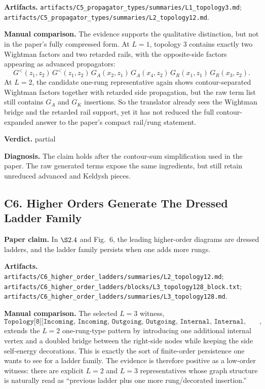 \documentclass[11pt]{article}
\begin{document}
\textbf{Artifacts.} \texttt{artifacts/C5\_propagator\_types/summaries/L1\_topology3.md}; \texttt{artifacts/C5\_propagator\_types/summaries/L2\_topology12.md}.

\textbf{Manual comparison.} The evidence supports the qualitative distinction, but not in the paper's fully compressed form. At $L=1$, topology 3 contains exactly two Wightman factors and two retarded rails, with the opposite-side factors appearing as advanced propagators:
\[
G^<(z_1,z_2)\,G^<(z_1,z_2)\,G_A(x_2,z_1)\,G_A(x_4,z_2)\,G_R(x_1,z_1)\,G_R(x_3,z_2).
\]
At $L=2$, the candidate one-rung representative again shows contour-separated Wightman factors together with retarded side propagation, but the raw term list still contains $G_A$ and $G_K$ insertions. So the translator already sees the Wightman bridge and the retarded rail support, yet it has not reduced the full contour-expanded answer to the paper's compact rail/rung statement.

\textbf{Verdict.} partial

\textbf{Diagnosis.} The claim holds after the contour-sum simplification used in the paper. The raw generated terms expose the same ingredients, but still retain unreduced advanced and Keldysh pieces.

\subsection*{C6. Higher Orders Generate The Dressed Ladder Family}
\textbf{Paper claim.} In $\S 2.4$ and Fig.~6, the leading higher-order diagrams are dressed ladders, and the ladder family persists when one adds more rungs.

\textbf{Artifacts.} \texttt{artifacts/C6\_higher\_order\_ladders/summaries/L2\_topology12.md}; \texttt{artifacts/C6\_higher\_order\_ladders/blocks/L3\_topology128\_block.txt}; \texttt{artifacts/C6\_higher\_order\_ladders/summaries/L3\_topology128.md}.

\textbf{Manual comparison.} The selected $L=3$ witness,
\[
\texttt{Topology[8][Incoming, Incoming, Outgoing, Outgoing, Internal, Internal, Loop[1], Loop[2], Loop[3], Loop[3]]},
\]
extends the $L=2$ one-rung-type pattern by introducing one additional internal vertex and a doubled bridge between the right-side nodes while keeping the side self-energy decorations. This is exactly the sort of finite-order persistence one wants to see for a ladder family. The evidence is therefore positive as a low-order witness: there are explicit $L=2$ and $L=3$ representatives whose graph structure is naturally read as ``previous ladder plus one more rung/decorated insertion.''
\end{document}
